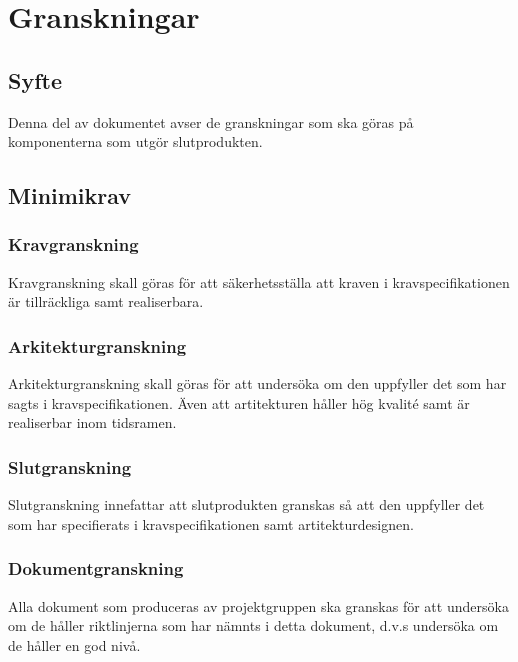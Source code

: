 \section{Granskningar}

\subsection{Syfte}
Denna del av dokumentet avser de granskningar som ska göras på komponenterna som utgör slutprodukten. 

\subsection{Minimikrav}

\subsubsection{Kravgranskning}
Kravgranskning skall göras för att säkerhetsställa att kraven i kravspecifikationen är tillräckliga samt realiserbara.

\subsubsection{Arkitekturgranskning}
Arkitekturgranskning skall göras för att undersöka om den uppfyller det som har sagts i kravspecifikationen. Även att artitekturen håller hög kvalité samt är realiserbar inom tidsramen. 

\subsubsection{Slutgranskning}
Slutgranskning innefattar att slutprodukten granskas så att den uppfyller det som har specifierats i kravspecifikationen samt artitekturdesignen. 

\subsubsection{Dokumentgranskning}
Alla dokument som produceras av projektgruppen ska granskas för att undersöka om de håller riktlinjerna som har nämnts i detta dokument, d.v.s undersöka om de håller en god nivå. 



